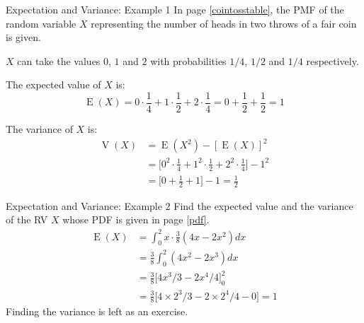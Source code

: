 \documentclass[12pt, aspectratio=169]{beamer}
\DeclareMathOperator{\E}{E}
\DeclareMathOperator{\V}{V}
\begin{document}
	\begin{frame}{Expectation and Variance: Example 1}
		In page \ref{cointosstable}, the PMF of the random variable \(X\) representing the number of heads in two throws of a fair coin is given.
		
		\(X\) can take the values $0$, $1$ and $2$ with probabilities $1/4$, $1/2$ and $1/4$ respectively.

		The expected value of $X$ is:
		\[
			\E(X) = 0 \cdot \frac{1}{4} + 1 \cdot \frac{1}{2} + 2 \cdot \frac{1}{4} = 0 + \frac{1}{2} + \frac{1}{2} = 1
		\]

		The variance of $X$ is:
		\begin{align*}
			\V(X) &= \E(X^2) - [\E(X)]^2 \\
			&=  \big[0^2 \cdot \frac{1}{4} + 1^2 \cdot \frac{1}{2} + 2^2 \cdot \frac{1}{4}\big] - 1^2 \\
			&= \big[0 + \frac{1}{2} + 1 \big] - 1 = \frac{1}{2}
		\end{align*}
	\end{frame}


	\begin{frame}{Expectation and Variance: Example 2}
		Find the expected value and the variance of the RV $X$ whose PDF is given in page \ref{pdf}.
		\begin{align*}
			\E(X) &= \int_{0}^{2} x \cdot \frac{3}{8}(4x - 2x^2) dx \\
			&= \frac{3}{8} \int_{0}^{2} (4x^2 - 2x^3) dx \\
			&= \frac{3}{8} \big[4x^3/3 - 2x^4/4 \big]_0^2 \\
			&= \frac{3}{8} \big[4 \times 2^3/3 - 2\times 2^4/4 - 0 \big] = 1
		\end{align*}
		Finding the variance is left as an exercise.
	\end{frame}
\end{document}

